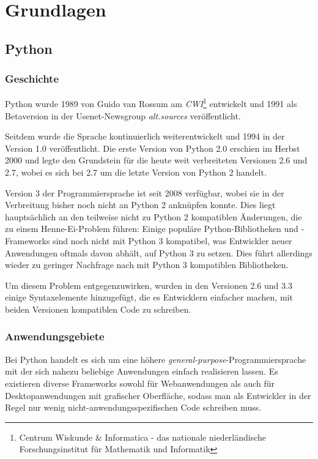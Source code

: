 \chapter{Grundlagen}

\section{Python}

\subsection{Geschichte}

Python wurde 1989 von Guido van Rossum am \emph{CWI}\footnote{Centrum Wiskunde \& Informatica - das
nationale niederländische Forschungsinstitut für Mathematik und Informatik} entwickelt und 1991 als
Betaversion in der Usenet-Newsgroup \emph{alt.sources} veröffentlicht.

Seitdem wurde die Sprache kontinuierlich weiterentwickelt und 1994 in der Version 1.0
veröffentlicht. Die erste Version von Python 2.0 erschien im Herbst 2000 und legte den Grundstein
für die heute weit verbreiteten Versionen 2.6 und 2.7, wobei es sich bei 2.7 um die letzte Version
von Python 2 handelt.

Version 3 der Programmiersprache ist seit 2008 verfügbar, wobei sie in der Verbreitung bisher noch
nicht an Python 2 anknüpfen konnte. Dies liegt hauptsächlich an den teilweise nicht zu Python 2
kompatiblen Änderungen, die zu einem Henne-Ei-Problem führen: Einige populäre Python-Bibliotheken
und -Frameworks sind noch nicht mit Python 3 kompatibel, was Entwickler neuer Anwendungen oftmals
davon abhält, auf Python 3 zu setzen. Dies führt allerdings wieder zu geringer Nachfrage nach mit
Python 3 kompatiblen Bibliotheken. \citep{pywiki:2or3}

Um diesem Problem entgegenzuwirken, wurden in den Versionen 2.6 und 3.3 einige Syntaxelemente
hinzugefügt, die es Entwicklern einfacher machen, mit beiden Versionen kompatiblen Code zu
schreiben. \citep{pep:414}


\subsection{Anwendungsgebiete}

Bei Python handelt es sich um eine höhere \emph{general-purpose}-Programmiersprache mit der sich
nahezu beliebige Anwendungen einfach realisieren lassen. Es existieren diverse Frameworks sowohl für
Webanwendungen als auch für Desktopanwendungen mit grafischer Oberfläche, sodass man als Entwickler
in der Regel nur wenig nicht-anwendungsspezifischen Code schreiben muss.

